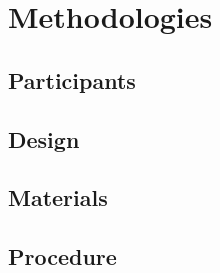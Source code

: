 \chapter{Methodologies}


\section{Participants}
\label{participants}


\section{Design}
\label{design}


\section{Materials}
\label{materials}


\section{Procedure}
\label{procedure}


